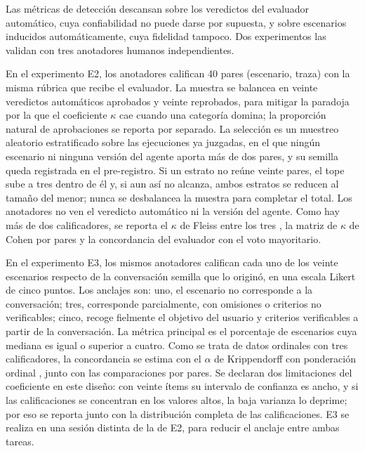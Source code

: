 Las métricas de detección descansan sobre los veredictos del evaluador automático, cuya confiabilidad no puede darse por supuesta, y sobre escenarios inducidos automáticamente, cuya fidelidad tampoco. Dos experimentos las validan con tres anotadores humanos independientes.
\par
En el experimento E2, los anotadores califican 40 pares (escenario, traza) con la misma rúbrica que recibe el evaluador. La muestra se balancea en veinte veredictos automáticos aprobados y veinte reprobados, para mitigar la paradoja por la que el coeficiente $\kappa$ cae cuando una categoría domina; la proporción natural de aprobaciones se reporta por separado. La selección es un muestreo aleatorio estratificado sobre las ejecuciones ya juzgadas, en el que ningún escenario ni ninguna versión del agente aporta más de dos pares, y su semilla queda registrada en el pre-registro. Si un estrato no reúne veinte pares, el tope sube a tres dentro de él y, si aun así no alcanza, ambos estratos se reducen al tamaño del menor; nunca se desbalancea la muestra para completar el total. Los anotadores no ven el veredicto automático ni la versión del agente. Como hay más de dos calificadores, se reporta el $\kappa$ de Fleiss entre los tres \cite{fleiss1971kappa}, la matriz de $\kappa$ de Cohen por pares y la concordancia del evaluador con el voto mayoritario.
\par
En el experimento E3, los mismos anotadores califican cada uno de los veinte escenarios respecto de la conversación semilla que lo originó, en una escala Likert de cinco puntos. Los anclajes son: uno, el escenario no corresponde a la conversación; tres, corresponde parcialmente, con omisiones o criterios no verificables; cinco, recoge fielmente el objetivo del usuario y criterios verificables a partir de la conversación. La métrica principal es el porcentaje de escenarios cuya mediana es igual o superior a cuatro. Como se trata de datos ordinales con tres calificadores, la concordancia se estima con el $\alpha$ de Krippendorff con ponderación ordinal \cite{hayes2007krippendorff}, junto con las comparaciones por pares. Se declaran dos limitaciones del coeficiente en este diseño: con veinte ítems su intervalo de confianza es ancho, y si las calificaciones se concentran en los valores altos, la baja varianza lo deprime; por eso se reporta junto con la distribución completa de las calificaciones. E3 se realiza en una sesión distinta de la de E2, para reducir el anclaje entre ambas tareas.
\par

